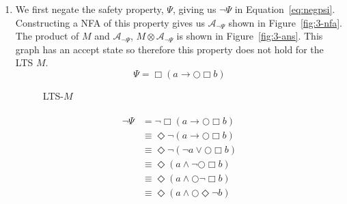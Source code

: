 \documentclass{article}
\begin{document}
\begin{enumerate}
    \item We first negate the safety property, $\Psi$, giving us $\neg\Psi$ in Equation~\ref{eq:negpsi}. Constructing a NFA of this property gives us $\mathcal{A}_{\neg\Psi}$ shown in Figure~\ref{fig:3-nfa}. The product of $M$ and $\mathcal{A}_{\neg\Psi}$, $M \otimes \mathcal{A}_{\neg\Psi}$ is shown in Figure~\ref{fig:3-ans}. This graph has an accept state so therefore this property does not hold for the LTS $M$.
        \begin{equation}
            \Psi = \Box\left(a \rightarrow \bigcirc\Box b\right)
        \end{equation}
        \begin{figure}[htpb]
            \centering
            \caption{LTS-$M$}%
            \label{fig:3-M}
        \end{figure}
        \begin{multline}\label{eq:negpsi}
            \begin{aligned}
                \neg\Psi &= \neg \Box(a \rightarrow \bigcirc\Box b) \\
                   &\equiv \Diamond\neg(a \rightarrow \bigcirc\Box b) \\
                   &\equiv \Diamond\neg(\neg a \vee \bigcirc\Box b) \\
                   &\equiv \Diamond(a \wedge \neg\bigcirc\Box b) \\
                   &\equiv \Diamond(a \wedge \bigcirc\neg\Box b) \\
                   &\equiv \Diamond(a \wedge \bigcirc\Diamond\neg b) 
            \end{aligned}
        \end{multline}
        \begin{figure}[htpb]
            \centering
\end{figure}
\end{enumerate}
\end{document}
